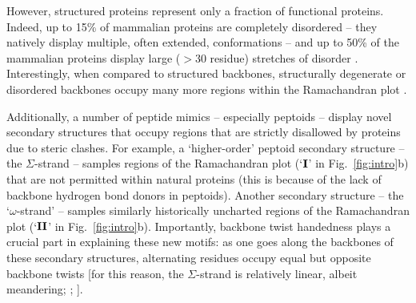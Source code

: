 \documentclass[fleqn,10pt,lineno]{wlpeerj} %
\newcommand{\n}[1]{{\color{black}#1}} %
\newcommand{\Fig}[1]{Fig.~\ref{#1}}
\begin{document}
\n{However, structured proteins represent only a fraction of functional proteins. Indeed, up to 15\% of mammalian proteins are completely disordered -- they natively display multiple, often extended, conformations \citep{Mannige2014b} -- and up to 50\% of the mammalian proteins display large ($>30$ residue) stretches of disorder \citep{Iakoucheva2002,Ward2004,Orosz2011}. Interestingly, when compared to structured backbones, structurally degenerate or disordered backbones occupy many more regions within the Ramachandran plot \citep{Beck2008}.}

\n{Additionally, a number of} peptide mimics -- especially peptoids \citep{Sun2013} -- display novel secondary structures that occupy regions that are strictly disallowed by proteins due to steric clashes. %
For example, a `higher-order' peptoid secondary structure -- the $\Sigma$-strand \citep{Mannige2015,Robertson2016} -- samples regions of the Ramachandran plot (`$\textrm{\textbf{I}}$' in \Fig{fig:intro}\n{b}) that are not permitted within natural proteins (this is because of the lack of backbone hydrogen bond donors in peptoids). Another secondary structure -- the `$\omega$-strand' \citep{Gorske2016} -- samples similarly historically uncharted regions of the Ramachandran plot (`$\textrm{\textbf{II}}$' in \Fig{fig:intro}\n{b}). Importantly, \n{backbone twist} handedness plays a crucial part in explaining these new motifs: as one goes along the backbones of these secondary structures, alternating residues occupy equal but opposite backbone twists [for this reason, the $\Sigma$-strand is relatively linear, albeit meandering; \cite{Mannige2015}; \cite{Mannige2016}].
\end{document}
